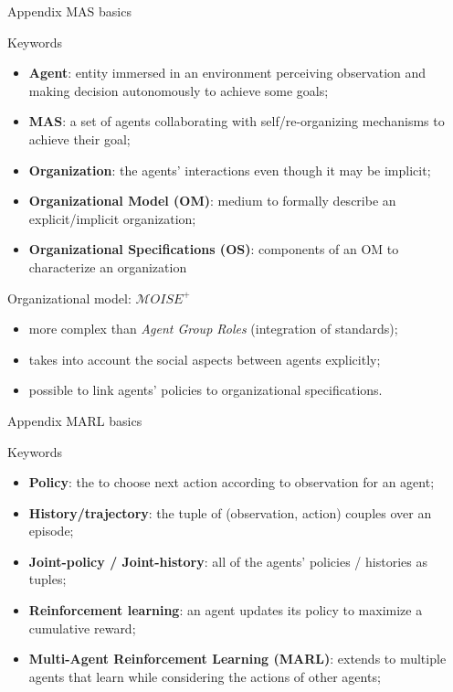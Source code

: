 \begin{frame}{Appendix}
    {MAS basics}

    \begin{block}{Keywords}
        \begin{itemize}
            \item \textbf{Agent}: entity immersed in an environment perceiving observation and making decision autonomously to achieve some goals;
            \item \textbf{MAS}: a set of agents collaborating with self/re-organizing mechanisms to achieve their goal;
            \item \textbf{Organization}: the agents' interactions even though it may be implicit;
            \item \textbf{Organizational Model (OM)}: medium to formally describe an explicit/implicit organization;
            \item \textbf{Organizational Specifications (OS)}: components of an OM to characterize an organization
        \end{itemize}
    \end{block}

    \begin{block}{Organizational model: $\mathcal{M}OISE^+$}
        \begin{itemize}
            \item more complex than \emph{Agent Group Roles} (integration of standards);
            \item takes into account the social aspects between agents explicitly;
            \item possible to link agents' policies to organizational specifications.
        \end{itemize}
    \end{block}

\end{frame}

\begin{frame}{Appendix}
    {MARL basics}

    \begin{block}{Keywords}
        \begin{itemize}
            \item \textbf{Policy}: the  to choose next action according to observation for an agent;
            \item \textbf{History/trajectory}: the tuple of (observation, action) couples over an episode;
            \item \textbf{Joint-policy / Joint-history}: all of the agents' policies / histories as tuples;
            \item \textbf{Reinforcement learning}: an agent updates its policy to maximize a cumulative reward;
            \item \textbf{Multi-Agent Reinforcement Learning (MARL)}: extends to multiple agents that learn while considering the actions of other agents;
        \end{itemize}
    \end{block}

\end{frame}

